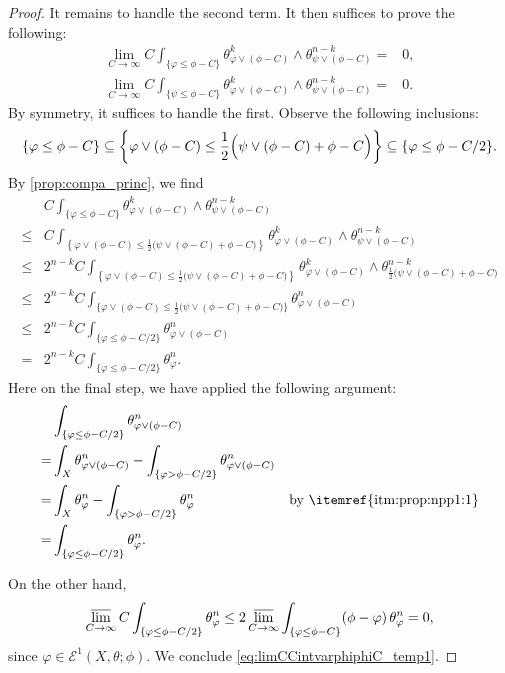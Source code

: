 \begin{proof}
    It remains to handle the second term. It then suffices to prove the following:
    \begin{equation}\label{eq:limCCintvarphiphiC_temp1}
    \begin{split}
    \lim_{C\to\infty} C\int_{\{\varphi\leq \phi-C\}} \theta_{\varphi\lor (\phi-C)}^k\wedge \theta_{\psi\lor (\phi-C)}^{n-k}=&0,\\
    \lim_{C\to\infty} C\int_{\{\psi\leq \phi-C\}} \theta_{\varphi\lor (\phi-C)}^k\wedge \theta_{\psi\lor (\phi-C)}^{n-k}=&0.
    \end{split}
    \end{equation}
    By symmetry, it suffices to handle the first. Observe the following inclusions:
    \[
    \{\varphi\leq \phi-C\}\subseteq \left\{ \varphi\lor (\phi-C)\leq \frac{1}{2}\Bigl( \psi\lor (\phi-C)+\phi-C \Bigr) \right\}\subseteq \{\varphi\leq \phi-C/2\}.
    \]
    By \cref{prop:compa_princ}, we find
    \[
    \begin{aligned}
        &C\int_{\{\varphi\leq \phi-C\}} \theta_{\varphi\lor (\phi-C)}^k\wedge \theta_{\psi\lor (\phi-C)}^{n-k}\\
        \leq & C\int_{\left\{\varphi\lor (\phi-C)\leq \frac{1}{2}\bigl(\psi\lor (\phi-C)+\phi-C\bigr)\right\}} \theta_{\varphi\lor (\phi-C)}^k\wedge \theta_{\psi\lor (\phi-C)}^{n-k}\\
        \leq & 2^{n-k}C\int_{\left\{\varphi\lor (\phi-C)\leq \frac{1}{2}\bigl(\psi\lor (\phi-C)+\phi-C\bigr)\right\}} \theta_{\varphi\lor (\phi-C)}^k\wedge \theta_{\frac{1}{2}\bigl(\psi\lor (\phi-C)+\phi-C\bigr)}^{n-k}\\
        \leq & 2^{n-k}C\int_{\{\varphi\lor (\phi-C)\leq \frac{1}{2}\bigl(\psi\lor (\phi-C)+\phi-C\bigr)\}} \theta_{\varphi\lor (\phi-C)}^n\\
        \leq & 2^{n-k}C\int_{\{\varphi\leq \phi-C/2\}} \theta_{\varphi\lor (\phi-C)}^n\\
        = & 2^{n-k}C\int_{\{\varphi\leq \phi-C/2\}} \theta_{\varphi}^n.
    \end{aligned}
    \]
    Here on the final step, we have applied the following argument:
    \[
    \begin{aligned}
    &\int_{\left\{\varphi\leq \phi-C/2 \right\}} \theta_{\varphi\lor (\phi-C)}^n &\\
    = &\int_X \theta_{\varphi\lor (\phi-C)}^n-\int_{\left\{\varphi> \phi-C/2 \right\}} \theta_{\varphi\lor (\phi-C)}^n &\\
    = & \int_X \theta_{\varphi}^n-\int_{\left\{\varphi> \phi-C/2 \right\}} \theta_{\varphi}^n & \textup{by \itemref{itm:prop:npp1:1}}\\
    =& \int_{\left\{\varphi\leq \phi-C/2 \right\}} \theta_{\varphi}^n. &
    \end{aligned}
    \]

    On the other hand,
    \[
    \varlimsup_{C\to\infty} C\int_{\{\varphi\leq \phi-C/2 \}} \theta_{\varphi}^n\leq 2 \varlimsup_{C\to\infty} \int_{\{\varphi\leq \phi-C \}}(\phi-\varphi)\, \theta_{\varphi}^n=0,
    \]
    since $\varphi\in \mathcal{E}^1(X,\theta;\phi)$. We conclude \eqref{eq:limCCintvarphiphiC_temp1}.
\end{proof}

